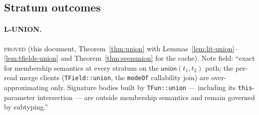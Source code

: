 \documentclass[11pt]{article}
\newcommand{\union}{\mathsf{union}}
\begin{document}
\subsection{Stratum outcomes}

\paragraph{L-UNION.} \textsc{proved}
(this document, Theorem~\ref{thm:union} with
Lemmas~\ref{lem:lit-union}--\ref{lem:tfields-union} and
Theorem~\ref{thm:seenunion} for the cache). Note field: ``exact for
membership semantics at every stratum on the $\union(t_1,t_2)$ path;
the per-read merge clients (\texttt{TField::union}, the
\texttt{modeOf} callability join) are over-approximating only.
Signature bodies built by \texttt{TFun::union} — including its
\texttt{this}-parameter intersection — are outside membership
semantics and remain governed by subtyping.''
\end{document}
